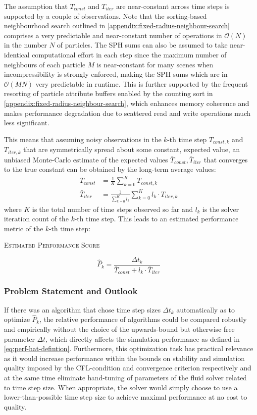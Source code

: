 \documentclass[oneside, a4paper]{book}
\newcommand{\equationnamed}[2]{%
  \setlength{\fboxsep}{2pt} %
  \setlength{\fboxrule}{0.01pt}
  \begin{center}
    \begin{minipage}{\textwidth}
      \begin{center}\textsc{#1}\end{center}
      #2
    \end{minipage}
  \end{center}
}
\newcommand\br[1]{\left(#1\right)}
\begin{document}
    
    The assumption that $T_{const}$ and $T_{iter}$ are near-constant across time steps is supported by a couple of observations. Note that the sorting-based neighbourhood search outlined in \autoref{appendix:fixed-radius-neighbour-search} comprises a very predictable and near-constant number of operations in $\mathcal{O}\br{N}$ in the number $N$ of particles. The SPH sums can also be assumed to take near-identical computational effort in each step since the maximum number of neighbours of each particle $M$ is near-constant for many scenes when incompressibility is strongly enforced, making the SPH sums which are in $\mathcal{O}\br{MN}$ very predictable in runtime. This is further supported by the frequent resorting of particle attribute buffers enabled by the counting sort in \autoref{appendix:fixed-radius-neighbour-search}, which enhances memory coherence and makes performance degradation due to scattered read and write operations much less significant. 
    
    This means that assuming noisy observations in the $k$-th time step $T_{const,k}$ and $T_{iter,k}$ that are symmetrically spread about some constant, expected value, an unbiased Monte-Carlo estimate of the expected values $\bar{T}_{const}, \bar{T}_{iter}$ that converges to the true constant can be obtained by the long-term average values:
    \begin{align}
      \bar{T}_{const} &= \frac{1}{K}\sum_{k=0}^K T_{const,k}\\
      \bar{T}_{iter} &= \frac{1}{\sum_{k=0}^K l_k}\sum_{k=0}^K  l_k \cdot T_{iter,k}
    \end{align}
    where $K$ is the total number of time steps observed so far and $l_k$ is the solver iteration count of the $k$-th time step. This leads to an estimated performance metric of the $k$-th time step:
    \equationnamed{Estimated Performance Score}{
      \begin{equation}\label{eq:perf-hat-defintion}
        \hat{P}_k = \frac{\Delta t_k}{\bar{T}_{const} + l_k \cdot \bar{T}_{iter}}
      \end{equation}
    }
    
    \subsubsection{Problem Statement and Outlook}

    If there was an algorithm that chose time step sizes $\Delta t_k$ automatically as to optimize $\hat{P}_k$, the relative performance of algorithms could be compared robustly and empirically without the choice of the upwards-bound but otherwise free parameter $\Delta t$, which directly affects the simulation performance as defined in \autoref{eq:perf-hat-defintion}. Furthermore, this optimization task has practical relevance as it would increase performance within the bounds on stability and simulation quality imposed by the CFL-condition and convergence criterion respectively and at the same time eliminate hand-tuning of parameters of the fluid solver related to time step size. When appropriate, the solver would simply choose to use a lower-than-possible time step size to achieve maximal performance at no cost to quality. 
\end{document}
